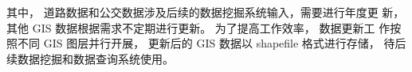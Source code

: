 其中， 道路数据和公交数据涉及后续的数据挖掘系统输入，需要进行年度更
新，其他 GIS 数据根据需求不定期进行更新。 为了提高工作效率， 数据更新工
作按照不同 GIS 图层并行开展， 更新后的 GIS 数据以 shapefile 格式进行存储，
待后续数据挖掘和数据查询系统使用。



